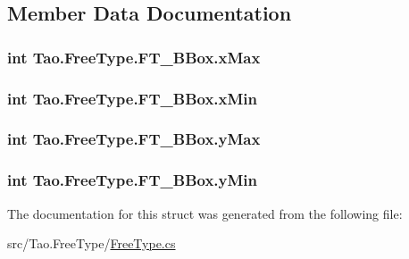 \subsection{Member Data Documentation}
\hypertarget{struct_tao_1_1_free_type_1_1_f_t___b_box_a953f001ff627dc2e983b0b809b57629d}{
\subsubsection[{xMax}]{\setlength{\rightskip}{0pt plus 5cm}int {\bf Tao.FreeType.FT\_\-BBox.xMax}}}
\label{struct_tao_1_1_free_type_1_1_f_t___b_box_a953f001ff627dc2e983b0b809b57629d}
\hypertarget{struct_tao_1_1_free_type_1_1_f_t___b_box_aa7c354ea7771f78c65baa946dc5c044f}{
\subsubsection[{xMin}]{\setlength{\rightskip}{0pt plus 5cm}int {\bf Tao.FreeType.FT\_\-BBox.xMin}}}
\label{struct_tao_1_1_free_type_1_1_f_t___b_box_aa7c354ea7771f78c65baa946dc5c044f}
\hypertarget{struct_tao_1_1_free_type_1_1_f_t___b_box_a04079183dbbfe8ba0be69f16e0fa05d8}{
\subsubsection[{yMax}]{\setlength{\rightskip}{0pt plus 5cm}int {\bf Tao.FreeType.FT\_\-BBox.yMax}}}
\label{struct_tao_1_1_free_type_1_1_f_t___b_box_a04079183dbbfe8ba0be69f16e0fa05d8}
\hypertarget{struct_tao_1_1_free_type_1_1_f_t___b_box_a4a3cbcef286ee2d42a028df6dc6b33cb}{
\subsubsection[{yMin}]{\setlength{\rightskip}{0pt plus 5cm}int {\bf Tao.FreeType.FT\_\-BBox.yMin}}}
\label{struct_tao_1_1_free_type_1_1_f_t___b_box_a4a3cbcef286ee2d42a028df6dc6b33cb}


The documentation for this struct was generated from the following file:\begin{DoxyCompactItemize}
\item 
src/Tao.FreeType/\hyperlink{_free_type_8cs}{FreeType.cs}\end{DoxyCompactItemize}
